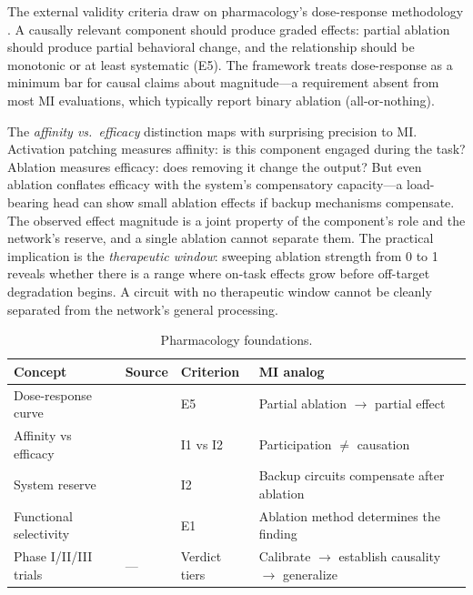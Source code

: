 \documentclass{article}
\begin{document}
The external validity criteria draw on pharmacology's dose-response methodology \citep{rang2006drug}. A causally relevant component should produce graded effects: partial ablation should produce partial behavioral change, and the relationship should be monotonic or at least systematic (E5). The framework treats dose-response as a minimum bar for causal claims about magnitude---a requirement absent from most MI evaluations, which typically report binary ablation (all-or-nothing).

The \emph{affinity vs.\ efficacy} distinction maps with surprising precision to MI. Activation patching measures affinity: is this component engaged during the task? Ablation measures efficacy: does removing it change the output? But even ablation conflates efficacy with the system's compensatory capacity---a load-bearing head can show small ablation effects if backup mechanisms compensate. The observed effect magnitude is a joint property of the component's role and the network's reserve, and a single ablation cannot separate them. The practical implication is the \emph{therapeutic window}: sweeping ablation strength from 0 to 1 reveals whether there is a range where on-task effects grow before off-target degradation begins. A circuit with no therapeutic window cannot be cleanly separated from the network's general processing.

\begin{table}[H]
\centering\small
\caption{Pharmacology foundations.}
\renewcommand{\arraystretch}{1.12}
\begin{tabular}{@{}l>{\raggedright\arraybackslash}p{2.2cm}l>{\raggedright\arraybackslash}p{4.5cm}@{}}
\toprule
\textbf{Concept} & \textbf{Source} & \textbf{Criterion} & \textbf{MI analog} \\
\midrule
Dose-response curve & \citet{hill1910possible} & E5 & Partial ablation $\to$ partial effect \\
\midrule
Affinity vs efficacy & \citet{stephenson1956modification} & I1 vs I2 & Participation $\neq$ causation \\
\midrule
System reserve & \citet{black1983operational} & I2 & Backup circuits compensate after ablation \\
\midrule
Functional selectivity & \citet{kenakin2004functional} & E1 & Ablation method determines the finding \\
\midrule
Phase I/II/III trials & --- & Verdict tiers & Calibrate $\to$ establish causality $\to$ generalize \\
\bottomrule
\end{tabular}
\end{table}
\end{document}
